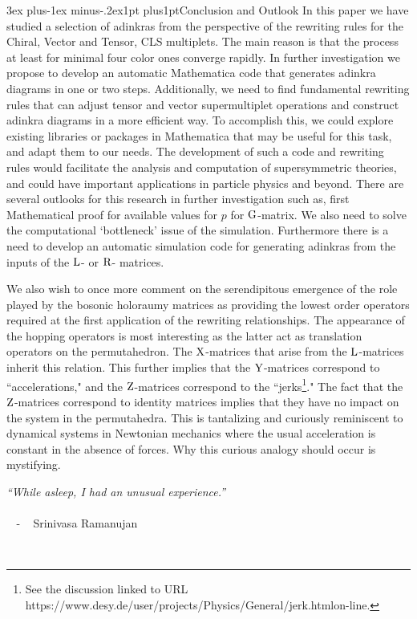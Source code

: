 \documentclass[12pt]{article}
\makeatletter
\def\rL{{\rm L}}
\def\rR{{\rm R}}
\let\bm\relax
\newcommand{\bm}[1]{{\boldsymbol{#1}}}
\def\section{\@startsection{section}{1}{\z@}
        {3ex plus-1ex minus-.2ex}{1pt plus1pt}{\large\sf\bfseries\boldmath}}
\makeatother
\begin{document}
\section{Conclusion and Outlook}
In this paper we have studied a selection of adinkras from the perspective of the rewriting rules for the Chiral, Vector and Tensor, CLS multiplets.  The main reason is that the process at least for minimal four color ones converge rapidly. In further investigation we propose to develop an automatic Mathematica code that generates adinkra diagrams in one or two steps. Additionally, we need to find fundamental rewriting rules that can adjust tensor and vector supermultiplet operations and construct adinkra diagrams in a more efficient way. To accomplish this, we could explore existing libraries or packages in Mathematica that may be useful for this task, and adapt them to our needs. The development of such a code and rewriting rules would facilitate the analysis and computation of supersymmetric theories, and could have important applications in particle physics and beyond.
There are several outlooks for this research in further investigation such as, first Mathematical proof for available values for $p$ for ${\bm{\rm G}}$-matrix. We also need to solve the computational `bottleneck' issue of the simulation. Furthermore there is a need to develop an automatic simulation code for generating adinkras from the inputs of the $\bm\rL$- or $\bm\rR$- matrices.

We also wish to once more comment on the serendipitous emergence of the role played by the bosonic holoraumy matrices as providing the lowest order operators required at the first application of the rewriting relationships. The appearance of the hopping operators is most interesting as the latter act as translation operators on the permutahedron. The ${\bm{\rm X}}$-matrices that arise from the $\bm\rL$-matrices inherit this relation. This further implies that the ${\bm{\rm Y}}$-matrices correspond to ``accelerations," and the ${\bm{\rm Z}}$-matrices correspond to the ``jerks\footnote{See the discussion linked to URL https://www.desy.de/user/projects/Physics/General/jerk.htmlon-line.}." 
The fact that the ${\bm{\rm Z}}$-matrices correspond to identity matrices implies that they have no impact on the system in the permutahedra. This is tantalizing and curiously reminiscent to dynamical systems in Newtonian mechanics where the usual acceleration is constant in the absence of forces. Why this curious analogy should occur is mystifying.

\begin{center}
\parbox{4in}{{\it 
``While asleep, I had an unusual experience.'' \\ ${~}$ 
${~}$ 
\\ ${~}$ }\,\,-\,\, \, Srinivasa Ramanujan
$~~~~~~~~~$}
 \parbox{4in}{
$~~$}  
\end{center}
\end{document}
